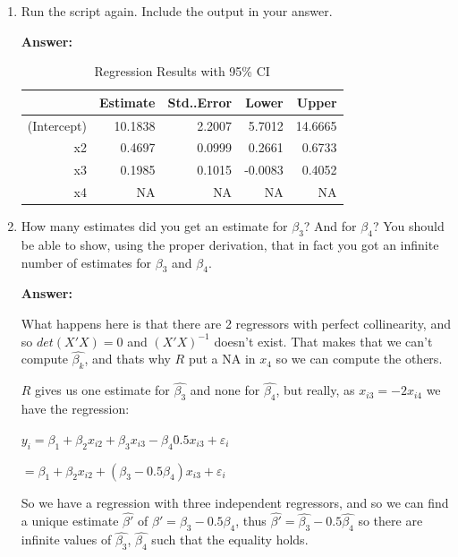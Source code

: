 \documentclass[12pt,a4paper]{article}
\begin{document}
\begin{enumerate}[label=(\roman*)]
  \item Run the script again. Include the output in your answer.
  
  \textbf{Answer:} 

  \begin{table}[ht]
\centering
\caption{Regression Results with 95\% CI } 
\label{tab:regression2}
\begin{tabular}{rrrrr}
  \hline
 & Estimate & Std..Error & Lower & Upper \\ 
  \hline
(Intercept) & 10.1838  &  2.2007 & 5.7012 & 14.6665 \\ 
  x2 & 0.4697  &  0.0999  & 0.2661 & 0.6733 \\ 
  x3 & 0.1985  &  0.1015 & -0.0083 & 0.4052 \\ 
  x4 & NA & NA & NA & NA \\ 
   \hline
\end{tabular}
\end{table}
  
  
  \item How many estimates did you get an estimate for $\beta_3$? And for $\beta_4$? You should be able to show, using the proper derivation, that in fact you got an infinite number of estimates for $\beta_3$ and $\beta_4$.
  
  \textbf{Answer:} 

  What happens here is that there are 2 regressors with perfect collinearity, and so $det(X'X)=0$ and $(X'X)^{-1}$ doesn't exist. That makes that we can't compute $\hat{\beta_k}$, and thats why $R$ put a NA in $x_4$ so we can compute the others.

  $R$ gives us one estimate for $\hat{\beta_3}$ and none for $\hat{\beta_4}$, but really, as $x_{i3} = -2x_{i4}$ we have the regression:

  \begin{center}
      $y_i = \beta_1 + \beta_2 x_{i2} + \beta_3 x_{i3} - \beta_4 0.5x_{i3} + \varepsilon_i$

      $= \beta_1 + \beta_2 x_{i2} + (\beta_3 -0.5\beta_4) x_{i3}+ \varepsilon_i$
  \end{center}

  So we have a regression with three independent regressors, and so we can find a unique estimate $\hat{\beta'}$ of $\beta' =\beta_3 -0.5\beta_4 $, thus $\hat{\beta'} =\hat{\beta_3} -0.5\hat{\beta_4} $ so there are infinite values of $\hat{\beta_3}$, $\hat{\beta_4}$ such that the equality holds.
\end{enumerate}
\end{document}

